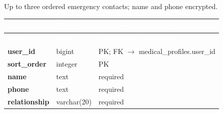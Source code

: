\subsection*{}
Up to three ordered emergency contacts; name and phone encrypted.\par\vspace{2pt}
{\tabfont\rowband
\begin{longtable}{@{}>{\raggedright\arraybackslash}p{}>{\raggedright\arraybackslash}p{}>{\raggedright\arraybackslash}p{}@{}}
\rowcolor{najdanavy}\textcolor{white}{\sffamily\bfseries\small Column} & \textcolor{white}{\sffamily\bfseries\small Type} & \textcolor{white}{\sffamily\bfseries\small Constraints and notes}\\
\endfirsthead
\rowcolor{najdanavy}\textcolor{white}{\sffamily\bfseries\small Column} & \textcolor{white}{\sffamily\bfseries\small Type} & \textcolor{white}{\sffamily\bfseries\small Constraints and notes}\\
\endhead
\bottomrule\endlastfoot
\textbf{user\_\allowbreak{}id} & bigint & PK; FK $\rightarrow$ medical\_\allowbreak{}profiles.user\_\allowbreak{}id\\
\textbf{sort\_\allowbreak{}order} & integer & PK\\
\textbf{name} & text & required\\
\textbf{phone} & text & required\\
\textbf{relationship} & varchar(20) & required\\
\end{longtable}}

